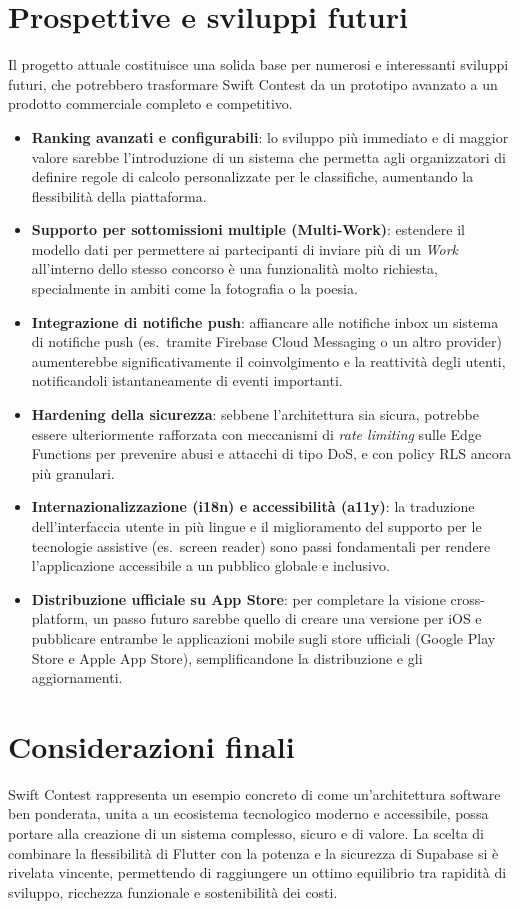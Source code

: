 \section{Prospettive e sviluppi futuri}\label{sec:prospettive-e-sviluppi-futuri}
Il progetto attuale costituisce una solida base per numerosi e interessanti sviluppi futuri, che potrebbero trasformare Swift Contest da un prototipo avanzato a un prodotto commerciale completo e competitivo.
\begin{itemize}
    \item \textbf{Ranking avanzati e configurabili}: lo sviluppo più immediato e di maggior valore sarebbe l'introduzione di un sistema che permetta agli organizzatori di definire regole di calcolo personalizzate per le classifiche, aumentando la flessibilità della piattaforma.
    \item \textbf{Supporto per sottomissioni multiple (Multi-Work)}: estendere il modello dati per permettere ai partecipanti di inviare più di un \emph{Work} all'interno dello stesso concorso è una funzionalità molto richiesta, specialmente in ambiti come la fotografia o la poesia.
    \item \textbf{Integrazione di notifiche push}: affiancare alle notifiche inbox un sistema di notifiche push (es.\ tramite Firebase Cloud Messaging o un altro provider) aumenterebbe significativamente il coinvolgimento e la reattività degli utenti, notificandoli istantaneamente di eventi importanti.
    \item \textbf{Hardening della sicurezza}: sebbene l'architettura sia sicura, potrebbe essere ulteriormente rafforzata con meccanismi di \emph{rate limiting} sulle Edge Functions per prevenire abusi e attacchi di tipo DoS, e con policy RLS ancora più granulari.
    \item \textbf{Internazionalizzazione (i18n) e accessibilità (a11y)}: la traduzione dell'interfaccia utente in più lingue e il miglioramento del supporto per le tecnologie assistive (es.\ screen reader) sono passi fondamentali per rendere l'applicazione accessibile a un pubblico globale e inclusivo.
    \item \textbf{Distribuzione ufficiale su App Store}: per completare la visione cross-platform, un passo futuro sarebbe quello di creare una versione per iOS e pubblicare entrambe le applicazioni mobile sugli store ufficiali (Google Play Store e Apple App Store), semplificandone la distribuzione e gli aggiornamenti.
\end{itemize}

\section{Considerazioni finali}\label{sec:considerazioni-finali}
Swift Contest rappresenta un esempio concreto di come un'architettura software ben ponderata, unita a un ecosistema tecnologico moderno e accessibile, possa portare alla creazione di un sistema complesso, sicuro e di valore.
La scelta di combinare la flessibilità di Flutter con la potenza e la sicurezza di Supabase si è rivelata vincente, permettendo di raggiungere un ottimo equilibrio tra rapidità di sviluppo, ricchezza funzionale e sostenibilità dei costi.


